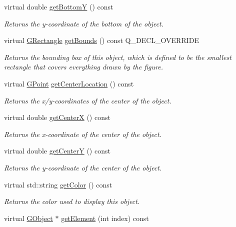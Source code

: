 \begin{DoxyCompactItemize}
virtual double \mbox{\hyperlink{classGObject_a4316a2406c18e1c6d061fe51fd355490}{get\+BottomY}} () const
\begin{DoxyCompactList}\small\item\em Returns the {\itshape y}-\/coordinate of the bottom of the object. \end{DoxyCompactList}\item 
virtual \mbox{\hyperlink{classGRectangle}{G\+Rectangle}} \mbox{\hyperlink{classGCompound_a2f46ec8a3b533c690b3b3e56d4f34afe}{get\+Bounds}} () const Q\+\_\+\+D\+E\+C\+L\+\_\+\+O\+V\+E\+R\+R\+I\+DE
\begin{DoxyCompactList}\small\item\em Returns the bounding box of this object, which is defined to be the smallest rectangle that covers everything drawn by the figure. \end{DoxyCompactList}\item 
virtual \mbox{\hyperlink{classGPoint}{G\+Point}} \mbox{\hyperlink{classGObject_a0909472e91448470bccdb62ecfb95d8b}{get\+Center\+Location}} () const
\begin{DoxyCompactList}\small\item\em Returns the x/y-\/coordinates of the center of the object. \end{DoxyCompactList}\item 
virtual double \mbox{\hyperlink{classGObject_a04df74355b545e0543112d5b8d924176}{get\+CenterX}} () const
\begin{DoxyCompactList}\small\item\em Returns the {\itshape x}-\/coordinate of the center of the object. \end{DoxyCompactList}\item 
virtual double \mbox{\hyperlink{classGObject_acb3287a3d507025a26f54b895713b947}{get\+CenterY}} () const
\begin{DoxyCompactList}\small\item\em Returns the {\itshape y}-\/coordinate of the center of the object. \end{DoxyCompactList}\item 
virtual std\+::string \mbox{\hyperlink{classGObject_aa061dfa488c31e18549d64363c1d0e34}{get\+Color}} () const
\begin{DoxyCompactList}\small\item\em Returns the color used to display this object. \end{DoxyCompactList}\item 
virtual \mbox{\hyperlink{classGObject}{G\+Object}} $\ast$ \mbox{\hyperlink{classGCompound_abde388cc529d22bb5f7f4a54d56049d8}{get\+Element}} (int index) const

\end{DoxyCompactItemize}
